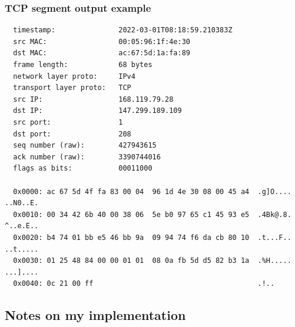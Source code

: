 \documentclass[a4paper]{article}
\begin{document}
  \subsubsection{TCP segment output example}

  \begin{verbatim}
  timestamp:               2022-03-01T08:18:59.210383Z
  src MAC:                 00:05:96:1f:4e:30
  dst MAC:                 ac:67:5d:1a:fa:89
  frame length:            68 bytes
  network layer proto:     IPv4
  transport layer proto:   TCP
  src IP:                  168.119.79.28
  dst IP:                  147.299.189.109
  src port:                1
  dst port:                208
  seq number (raw):        427943615
  ack number (raw):        3390744016
  flags as bits:           00011000

  0x0000: ac 67 5d 4f fa 83 00 04  96 1d 4e 30 08 00 45 a4  .g]O.... ..N0..E.
  0x0010: 00 34 42 6b 40 00 38 06  5e b0 97 65 c1 45 93 e5  .4Bk@.8. ^..e.E..
  0x0020: b4 74 01 bb e5 46 bb 9a  09 94 74 f6 da cb 80 10  .t...F.. ..t.....
  0x0030: 01 25 48 84 00 00 01 01  08 0a fb 5d d5 82 b3 1a  .%H..... ...]....
  0x0040: 0c 21 00 ff                                       .!..
  \end{verbatim}


  \subsection{Notes on my implementation}
\end{document}
